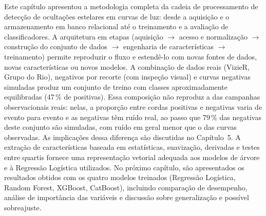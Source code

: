 
Este capítulo apresentou a metodologia completa da cadeia de processamento de detecção de ocultações estelares em curvas de luz: desde a aquisição e o armazenamento em banco relacional até o treinamento e a avaliação de classificadores. A arquitetura em etapas (aquisição \(\to\) acesso e normalização \(\to\) construção do conjunto de dados \(\to\) engenharia de características \(\to\) treinamento) permite reproduzir o fluxo e estendê-lo com novas fontes de dados, novas características ou novos modelos. A combinação de dados reais (VizieR, Grupo do Rio), negativos por recorte (com inspeção visual) e curvas negativas simuladas produz um conjunto de treino com classes aproximadamente equilibradas (47\,\% de positivas). Essa composição não reproduz a das campanhas observacionais reais: nelas, a proporção entre cordas positivas e negativas varia de evento para evento e as negativas têm ruído real, ao passo que 79\,\% das negativas deste conjunto são simuladas, com ruído em geral menor que o das curvas observadas. As implicações dessa diferença são discutidas no Capítulo~5. A extração de características baseada em estatísticas, suavização, derivadas e testes entre quartis fornece uma representação vetorial adequada aos modelos de árvore e à Regressão Logística utilizados. No próximo capítulo, são apresentados os resultados obtidos com os quatro modelos treinados (Regressão Logística, Random Forest, XGBoost, CatBoost), incluindo comparação de desempenho, análise de importância das variáveis e discussão sobre generalização e possível sobreajuste.
